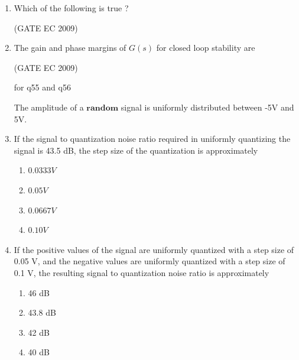\documentclass[journal,12pt,onecolumn]{IEEEtran}
\theoremstyle{remark}
\begin{document}
\begin{enumerate}[start=1, label={Q\arabic*.}]
\item Which of the following is true ?
\begin{enumerate}[label=(\Alph*)]
\end{enumerate}
\hfill (GATE EC 2009)

\item The gain and phase margins of $G(s)$ for closed loop stability are
\begin{enumerate}[label=(\Alph*)]
\end{enumerate}
\hfill (GATE EC 2009)

for q55 and q56 

The amplitude of a $\textbf{random}$ signal is uniformly distributed between -5V and 5V.

\item If the signal to quantization noise ratio required in uniformly quantizing the signal is 43.5 dB, the step size of the quantization is approximately 
\begin{enumerate}[label=(\Alph*)]
    \item $0.0333 V$
    \item $0.05 V$
    \item $0.0667 V$
    \item $0.10 V$
\end{enumerate}

\item If the positive values of the signal are uniformly quantized with a step size of 0.05 V, and the negative values are uniformly quantized with a step size of 0.1 V, the resulting signal to quantization noise ratio is approximately 
\begin{enumerate}[label=(\Alph*)]
    \item 46 dB
    \item 43.8 dB
    \item 42 dB
    \item 40 dB
\end{enumerate}


\end{enumerate}
\end{document}
